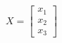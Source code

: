 \documentclass[preview]{standalone}
\begin{document}
\begin{align*}
X = \begin{bmatrix} x_1 \\ x_2 \\ x_3 \end{bmatrix}
\end{align*}
\end{document}
